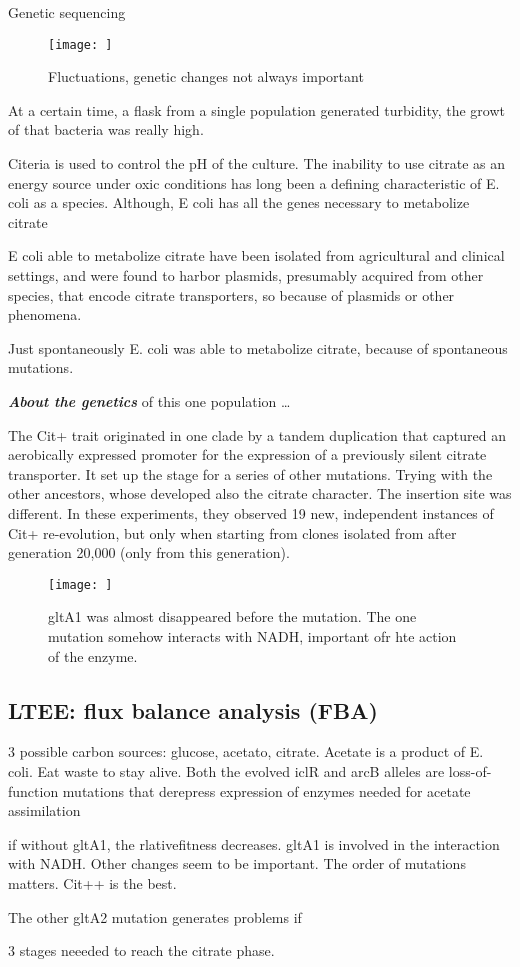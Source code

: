 Genetic sequencing

\begin{figure}[h]
\caption{Fluctuations, genetic changes not always important}
\centering
\texttt{[image: ]}
\end{figure}

At a certain time, a flask from a single population generated turbidity, the growt of that bacteria was really high.

Citeria is used to control the pH of the culture. The inability to use citrate as an energy source
under oxic conditions has long been a defining characteristic of E. coli as a species. Although, E coli has all the genes necessary to metabolize citrate

E coli able to metabolize citrate have been isolated from agricultural and
clinical settings, and were found to harbor
plasmids, presumably acquired from other
species, that encode citrate transporters, so because of plasmids or other phenomena.

Just spontaneously E. coli was able to metabolize citrate, because of spontaneous mutations. 

\textbf{\textit{About the genetics}} of this one population \dots

The Cit+ trait originated in one clade by a tandem duplication that captured an aerobically expressed promoter for the expression of a previously silent citrate transporter. It set up the stage for a series of other mutations. Trying with the other ancestors, whose developed also the citrate character. The insertion site was different.  In these experiments, they observed 19 new, independent instances of
Cit+ re-evolution, but only when starting from clones isolated from after generation 20,000 (only from this generation).

\begin{figure}[h]
\caption{gltA1 was almost disappeared before the mutation. The one mutation somehow interacts with NADH, important ofr hte action of the enzyme.}
\centering
\texttt{[image: ]}
\end{figure}


\subsection{LTEE: flux balance analysis (FBA)}

3 possible carbon sources: glucose, acetato, citrate. Acetate is a product of E. coli. Eat waste to stay alive. Both the evolved iclR and arcB alleles are loss-of- function mutations that
derepress expression of enzymes needed for acetate assimilation


if without gltA1, the rlativefitness decreases. gltA1 is involved in the interaction with NADH. Other changes seem to be important. The order of mutations matters. Cit++ is the best.

The other gltA2 mutation generates problems if 

3 stages neeeded to reach the citrate phase.
